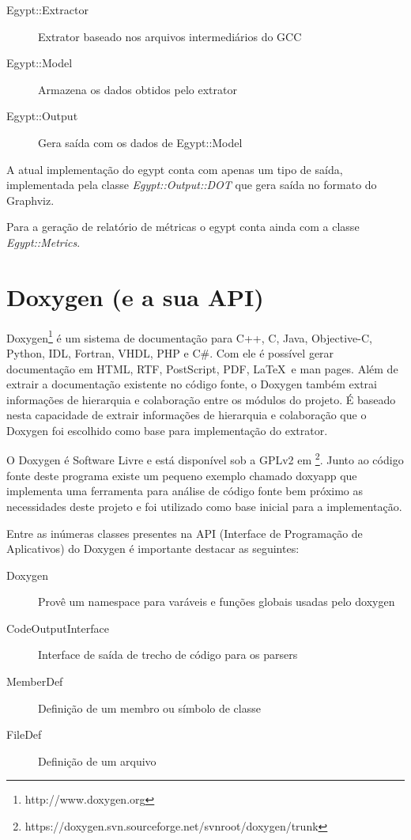 \begin{description}
\item[Egypt::Extractor] Extrator baseado nos arquivos intermediários do GCC
\item[Egypt::Model] Armazena os dados obtidos pelo extrator
\item[Egypt::Output] Gera saída com os dados de Egypt::Model
\end{description}

A atual implementação do egypt conta com apenas um tipo de saída, implementada
pela classe {\it Egypt::Output::DOT} que gera saída no formato do Graphviz.

Para a geração de relatório de métricas o egypt conta ainda com a classe {\it
Egypt::Metrics}.

\section{Doxygen (e a sua API)}

Doxygen\footnote{http://www.doxygen.org} é um sistema de documentação para C++,
C, Java, Objective-C, Python, IDL,
Fortran, VHDL, PHP e C\#. Com ele é possível gerar documentação em
HTML, RTF,
PostScript, PDF, \LaTeX\ e man pages.
Além de extrair a documentação existente no código fonte, o Doxygen também extrai
informações de hierarquia e colaboração entre os módulos do projeto. É baseado
nesta capacidade de extrair informações de hierarquia e colaboração que o
Doxygen foi escolhido como base para implementação do extrator.

O Doxygen é Software Livre e está disponível sob a GPLv2 em
\footnote{https://doxygen.svn.sourceforge.net/svnroot/doxygen/trunk}. Junto ao
código fonte deste programa existe um pequeno exemplo chamado doxyapp que
implementa uma ferramenta para análise de código fonte bem próximo as
necessidades deste projeto e foi utilizado como base inicial para a
implementação.

Entre as inúmeras classes presentes na API (Interface de Programação de Aplicativos) do Doxygen é importante
destacar as seguintes:

\begin{description}
\item[Doxygen] Provê um namespace para varáveis e funções globais usadas pelo doxygen
\item[CodeOutputInterface] Interface de saída de trecho de código para os parsers
\item[MemberDef] Definição de um membro ou símbolo de classe
\item[FileDef] Definição de um arquivo
\end{description}

